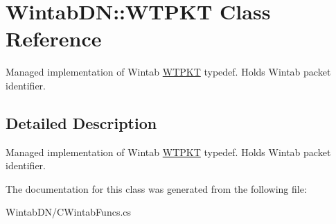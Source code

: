 \hypertarget{class_wintab_d_n_1_1_w_t_p_k_t}{
\section{WintabDN::WTPKT Class Reference}
\label{class_wintab_d_n_1_1_w_t_p_k_t}
}


Managed implementation of Wintab \hyperlink{class_wintab_d_n_1_1_w_t_p_k_t}{WTPKT} typedef. Holds Wintab packet identifier.  




\subsection{Detailed Description}
Managed implementation of Wintab \hyperlink{class_wintab_d_n_1_1_w_t_p_k_t}{WTPKT} typedef. Holds Wintab packet identifier. 

The documentation for this class was generated from the following file:\begin{DoxyCompactItemize}
\item 
WintabDN/CWintabFuncs.cs\end{DoxyCompactItemize}
